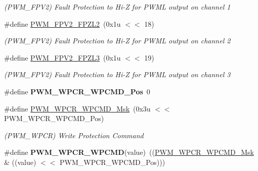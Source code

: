 \begin{DoxyCompactItemize}
\begin{DoxyCompactList}\small\item\em (P\+W\+M\+\_\+\+F\+P\+V2) Fault Protection to Hi-\/Z for P\+W\+ML output on channel 1 \end{DoxyCompactList}\item 
\mbox{\label{group__SAMS70__PWM_ga8dfd8292ee88bbc5d29dfbd95ee13fa5}} 
\#define \mbox{\hyperlink{group__SAMS70__PWM_ga8dfd8292ee88bbc5d29dfbd95ee13fa5}{P\+W\+M\+\_\+\+F\+P\+V2\+\_\+\+F\+P\+Z\+L2}}~(0x1u $<$$<$ 18)
\begin{DoxyCompactList}\small\item\em (P\+W\+M\+\_\+\+F\+P\+V2) Fault Protection to Hi-\/Z for P\+W\+ML output on channel 2 \end{DoxyCompactList}\item 
\mbox{\label{group__SAMS70__PWM_gac0e13917da26fc4f78fbfe7fd4e427bd}} 
\#define \mbox{\hyperlink{group__SAMS70__PWM_gac0e13917da26fc4f78fbfe7fd4e427bd}{P\+W\+M\+\_\+\+F\+P\+V2\+\_\+\+F\+P\+Z\+L3}}~(0x1u $<$$<$ 19)
\begin{DoxyCompactList}\small\item\em (P\+W\+M\+\_\+\+F\+P\+V2) Fault Protection to Hi-\/Z for P\+W\+ML output on channel 3 \end{DoxyCompactList}\item 
\mbox{\label{group__SAMS70__PWM_ga0c519a2fcf5e2c16257d782d075ab6c3}} 
\#define {\bfseries P\+W\+M\+\_\+\+W\+P\+C\+R\+\_\+\+W\+P\+C\+M\+D\+\_\+\+Pos}~0
\item 
\mbox{\label{group__SAMS70__PWM_ga5808d6cf04c4e5212002b099d4005be7}} 
\#define \mbox{\hyperlink{group__SAMS70__PWM_ga5808d6cf04c4e5212002b099d4005be7}{P\+W\+M\+\_\+\+W\+P\+C\+R\+\_\+\+W\+P\+C\+M\+D\+\_\+\+Msk}}~(0x3u $<$$<$ P\+W\+M\+\_\+\+W\+P\+C\+R\+\_\+\+W\+P\+C\+M\+D\+\_\+\+Pos)
\begin{DoxyCompactList}\small\item\em (P\+W\+M\+\_\+\+W\+P\+CR) Write Protection Command \end{DoxyCompactList}\item 
\mbox{\label{group__SAMS70__PWM_ga56d93360b848ae878f968ec1de4f78a5}} 
\#define {\bfseries P\+W\+M\+\_\+\+W\+P\+C\+R\+\_\+\+W\+P\+C\+MD}(value)~((\mbox{\hyperlink{group__SAMV71__PWM_ga5808d6cf04c4e5212002b099d4005be7}{P\+W\+M\+\_\+\+W\+P\+C\+R\+\_\+\+W\+P\+C\+M\+D\+\_\+\+Msk}} \& ((value) $<$$<$ P\+W\+M\+\_\+\+W\+P\+C\+R\+\_\+\+W\+P\+C\+M\+D\+\_\+\+Pos)))

\end{DoxyCompactItemize}
